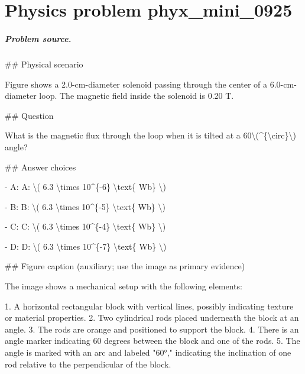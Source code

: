 
\chapter{Physics problem phyx\_mini\_0925}
\label{ch:PhyXMiniProblems_problem_phyx_mini_0925}

\paragraph{Problem source.}
\#\# Physical scenario

Figure shows a 2.0-cm-diameter solenoid passing through the center of a 6.0-cm-diameter loop. The magnetic field inside the solenoid is 0.20 T.

\#\# Question

What is the magnetic flux through the loop when it is tilted at a 60\textbackslash{}(\textasciicircum{}\{\textbackslash{}circ\}\textbackslash{}) angle?

\#\# Answer choices

- A: A: \textbackslash{}( 6.3 \textbackslash{}times 10\textasciicircum{}\{-6\} \textbackslash{}text\{ Wb\} \textbackslash{})

- B: B: \textbackslash{}( 6.3 \textbackslash{}times 10\textasciicircum{}\{-5\} \textbackslash{}text\{ Wb\} \textbackslash{})

- C: C: \textbackslash{}( 6.3 \textbackslash{}times 10\textasciicircum{}\{-4\} \textbackslash{}text\{ Wb\} \textbackslash{})

- D: D: \textbackslash{}( 6.3 \textbackslash{}times 10\textasciicircum{}\{-7\} \textbackslash{}text\{ Wb\} \textbackslash{})

\#\# Figure caption (auxiliary; use the image as primary evidence)

The image shows a mechanical setup with the following elements:

1. A horizontal rectangular block with vertical lines, possibly indicating texture or material properties.
2. Two cylindrical rods placed underneath the block at an angle.
3. The rods are orange and positioned to support the block.
4. There is an angle marker indicating 60 degrees between the block and one of the rods.
5. The angle is marked with an arc and labeled "60°," indicating the inclination of one rod relative to the perpendicular of the block.


